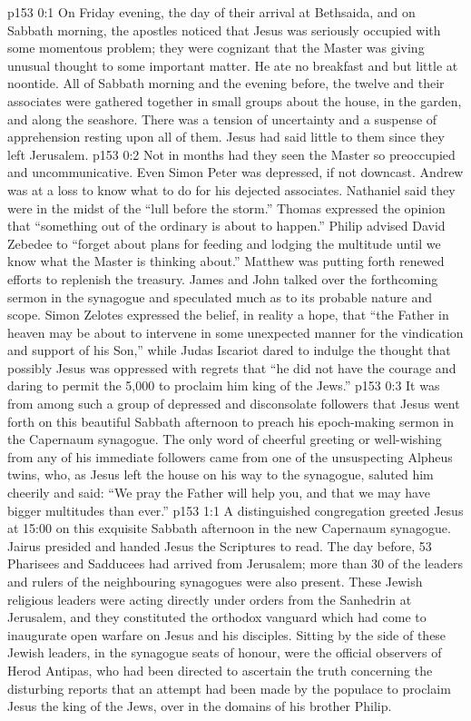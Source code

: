 \author{Midwayer Commission}
\vs p153 0:1 On Friday evening, the day of their arrival at Bethsaida, and on Sabbath morning, the apostles noticed that Jesus was seriously occupied with some momentous problem; they were cognizant that the Master was giving unusual thought to some important matter. He ate no breakfast and but little at noontide. All of Sabbath morning and the evening before, the twelve and their associates were gathered together in small groups about the house, in the garden, and along the seashore. There was a tension of uncertainty and a suspense of apprehension resting upon all of them. Jesus had said little to them since they left Jerusalem.
\vs p153 0:2 Not in months had they seen the Master so preoccupied and uncommunicative. Even Simon Peter was depressed, if not downcast. Andrew was at a loss to know what to do for his dejected associates. Nathaniel said they were in the midst of the “lull before the storm.” Thomas expressed the opinion that “something out of the ordinary is about to happen.” Philip advised David Zebedee to “forget about plans for feeding and lodging the multitude until we know what the Master is thinking about.” Matthew was putting forth renewed efforts to replenish the treasury. James and John talked over the forthcoming sermon in the synagogue and speculated much as to its probable nature and scope. Simon Zelotes expressed the belief, in reality a hope, that “the Father in heaven may be about to intervene in some unexpected manner for the vindication and support of his Son,” while Judas Iscariot dared to indulge the thought that possibly Jesus was oppressed with regrets that “he did not have the courage and daring to permit the 5,000 to proclaim him king of the Jews.”
\vs p153 0:3 It was from among such a group of depressed and disconsolate followers that Jesus went forth on this beautiful Sabbath afternoon to preach his epoch\hyp{}making sermon in the Capernaum synagogue. The only word of cheerful greeting or well\hyp{}wishing from any of his immediate followers came from one of the unsuspecting Alpheus twins, who, as Jesus left the house on his way to the synagogue, saluted him cheerily and said: “We pray the Father will help you, and that we may have bigger multitudes than ever.”
\vs p153 1:1 A distinguished congregation greeted Jesus at 15:00 on this exquisite Sabbath afternoon in the new Capernaum synagogue. Jairus presided and handed Jesus the Scriptures to read. The day before, 53 Pharisees and Sadducees had arrived from Jerusalem; more than 30 of the leaders and rulers of the neighbouring synagogues were also present. These Jewish religious leaders were acting directly under orders from the Sanhedrin at Jerusalem, and they constituted the orthodox vanguard which had come to inaugurate open warfare on Jesus and his disciples. Sitting by the side of these Jewish leaders, in the synagogue seats of honour, were the official observers of Herod Antipas, who had been directed to ascertain the truth concerning the disturbing reports that an attempt had been made by the populace to proclaim Jesus the king of the Jews, over in the domains of his brother Philip.

